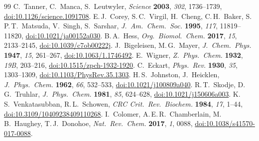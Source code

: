 \documentclass[11pt,a4paper]{article}
\begin{document}
\begin{thebibliography}{99}
 C.\ Tanner, C.\ Manca, S.\ Leutwyler, \textit{Science} \textbf{2003}, \textit{302}, 1736--1739, \href{https://doi.org/10.1126/science.1091708}{doi:10.1126/science.1091708}.
 E.\,J.\ Corey, S.\,C.\ Virgil, H.\ Cheng, C.\,H.\ Baker, S.\,P.\,T.\ Matsuda, V.\ Singh, S.\ Sarshar, \textit{J.\ Am.\ Chem.\ Soc.} \textbf{1995}, \textit{117}, 11819--11820, \href{https://doi.org/10.1021/ja00152a030}{doi:10.1021/ja00152a030}.
 B.\,A.\ Hess, \textit{Org.\ Biomol.\ Chem.} \textbf{2017}, \textit{15}, 2133--2145, \href{https://doi.org/10.1039/c7ob00222j}{doi:10.1039/c7ob00222j}.
 J.\ Bigeleisen, M.\,G.\ Mayer, \textit{J.\ Chem.\ Phys.} \textbf{1947}, \textit{15}, 261--267, \href{https://doi.org/10.1063/1.1746492}{doi:10.1063/1.1746492}.
 E.\ Wigner, \textit{Z.\ Phys.\ Chem.} \textbf{1932}, \textit{19B}, 203--216, \href{https://doi.org/10.1515/zpch-1932-1920}{doi:10.1515/zpch-1932-1920}.
 C.\ Eckart, \textit{Phys.\ Rev.} \textbf{1930}, \textit{35}, 1303--1309, \href{https://doi.org/10.1103/PhysRev.35.1303}{doi:10.1103/PhysRev.35.1303}.
 H.\,S.\ Johnston, J.\ Heicklen, \textit{J.\ Phys.\ Chem.} \textbf{1962}, \textit{66}, 532--533, \href{https://doi.org/10.1021/j100809a040}{doi:10.1021/j100809a040}.
 R.\,T.\ Skodje, D.\,G.\ Truhlar, \textit{J.\ Phys.\ Chem.} \textbf{1981}, \textit{85}, 624--628, \href{https://doi.org/10.1021/j150606a003}{doi:10.1021/j150606a003}.
 K.\,S.\ Venkatasubban, R.\,L.\ Schowen, \textit{CRC Crit.\ Rev.\ Biochem.} \textbf{1984}, \textit{17}, 1--44, \href{https://doi.org/10.3109/10409238409110268}{doi:10.3109/10409238409110268}.
 I.\ Colomer, A.\,E.\,R.\ Chamberlain, M.\,B.\ Haughey, T.\,J.\ Donohoe, \textit{Nat.\ Rev.\ Chem.} \textbf{2017}, \textit{1}, 0088, \href{https://doi.org/10.1038/s41570-017-0088}{doi:10.1038/s41570-017-0088}.
\end{thebibliography}
\end{document}
